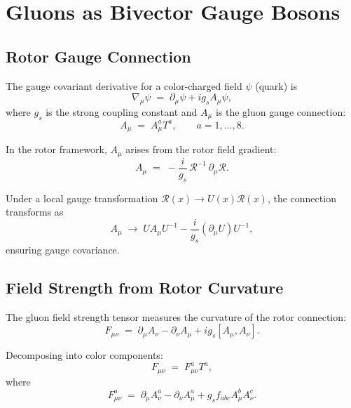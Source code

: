 \documentclass[11pt,a4paper]{article}
\newcommand{\Rotor}{\mathcal{R}}
\newcommand{\D}{\nabla}
\theoremstyle{definition}
\theoremstyle{plain}
\theoremstyle{remark}
\begin{document}
\section{Gluons as Bivector Gauge Bosons}
\label{sec:gluons}

\subsection{Rotor Gauge Connection}

The gauge covariant derivative for a color-charged field $\psi$ (quark) is
\begin{equation}
\D_\mu \psi \;=\; \partial_\mu \psi + ig_s A_\mu \psi,
\label{eq:covariant-derivative}
\end{equation}
where $g_s$ is the strong coupling constant and $A_\mu$ is the gluon gauge connection:
\begin{equation}
A_\mu \;=\; A_\mu^a T^a, \qquad a = 1,\ldots,8.
\label{eq:gluon-connection}
\end{equation}

In the rotor framework, $A_\mu$ arises from the rotor field gradient:
\begin{equation}
A_\mu \;=\; -\frac{i}{g_s}\,\Rotor^{-1}\,\partial_\mu\Rotor.
\label{eq:rotor-connection}
\end{equation}

Under a local gauge transformation $\Rotor(x) \to U(x)\Rotor(x)$, the connection transforms as
\begin{equation}
A_\mu \;\to\; U A_\mu U^{-1} - \frac{i}{g_s}(\partial_\mu U) U^{-1},
\end{equation}
ensuring gauge covariance.

\subsection{Field Strength from Rotor Curvature}

The gluon field strength tensor measures the curvature of the rotor connection:
\begin{equation}
F_{\mu\nu} \;=\; \partial_\mu A_\nu - \partial_\nu A_\mu + ig_s [A_\mu, A_\nu].
\label{eq:field-strength}
\end{equation}

Decomposing into color components:
\begin{equation}
F_{\mu\nu} \;=\; F_{\mu\nu}^a T^a,
\end{equation}
where
\begin{equation}
F_{\mu\nu}^a \;=\; \partial_\mu A_\nu^a - \partial_\nu A_\mu^a + g_s f_{abc} A_\mu^b A_\nu^c.
\label{eq:gluon-field-strength}
\end{equation}
\end{document}
